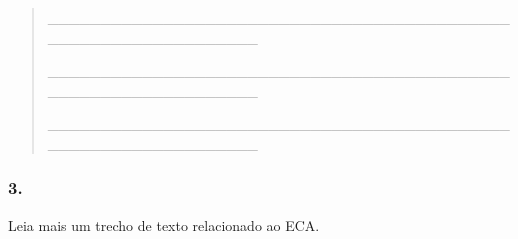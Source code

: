 \begin{quote}
\_\_\_\_\_\_\_\_\_\_\_\_\_\_\_\_\_\_\_\_\_\_\_\_\_\_\_\_\_\_\_\_\_\_\_\_\_\_\_\_\_\_\_\_\_\_\_\_\_\_\_\_\_\_\_\_\_\_\_\_\_\_\_\_

\_\_\_\_\_\_\_\_\_\_\_\_\_\_\_\_\_\_\_\_\_\_\_\_\_\_\_\_\_\_\_\_\_\_\_\_\_\_\_\_\_\_\_\_\_\_\_\_\_\_\_\_\_\_\_\_\_\_\_\_\_\_\_\_

\_\_\_\_\_\_\_\_\_\_\_\_\_\_\_\_\_\_\_\_\_\_\_\_\_\_\_\_\_\_\_\_\_\_\_\_\_\_\_\_\_\_\_\_\_\_\_\_\_\_\_\_\_\_\_\_\_\_\_\_\_\_\_\_
\end{quote}

\subsubsection{3. }\label{section-62}

Leia mais um trecho de texto relacionado ao ECA.

